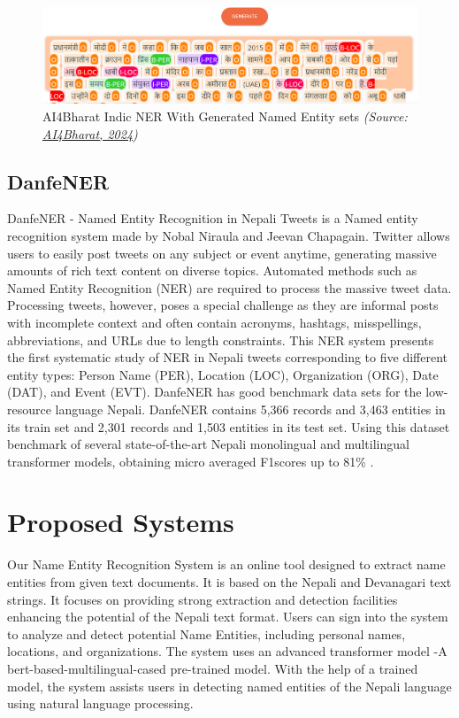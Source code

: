 \begin{figure}[H]
\centering
\includegraphics [scale=0.46 ]{img/ai4bharat/ai4bharat2.png}
\caption[AI4Bharat
Indic NER With Generated Named Entity sets]{AI4Bharat
Indic NER With Generated Named Entity sets \textit{(Source: \href{https://ai4bharat.iitm.ac.in/}{AI4Bharat, 2024})}}
\label{fig:DisplaCy.png}

\end{figure}



\subsection{DanfeNER}

DanfeNER - Named Entity Recognition in Nepali Tweets is a Named entity recognition system made by Nobal Niraula and Jeevan Chapagain. Twitter allows users to easily post tweets on any subject or event anytime, generating massive amounts of rich text content on diverse topics. Automated methods such as Named Entity Recognition (NER) are required to process the massive tweet data. Processing tweets, however, poses a special challenge as they are informal posts with incomplete context and often contain acronyms, hashtags, misspellings, abbreviations, and URLs due to length constraints. This NER system presents the first systematic study of NER in Nepali tweets corresponding to five different entity types: Person Name (PER), Location (LOC), Organization (ORG), Date (DAT), and Event (EVT). DanfeNER has good benchmark data sets for the low-resource language Nepali. DanfeNER contains 5,366 records and 3,463 entities in its train set and 2,301 records and 1,503 entities in its test set. Using this dataset benchmark of several state-of-the-art Nepali monolingual and multilingual transformer models, obtaining micro averaged F1scores up to 81\% \cite{Niraula_Chapagain_2023}.

\section{Proposed Systems}
Our Name Entity Recognition System is an online tool designed to extract name entities from given text documents. It is based on the Nepali and Devanagari text strings. It focuses on providing strong extraction and detection facilities enhancing the potential of the Nepali text format. Users can sign into the system to analyze and detect potential Name Entities, including personal names, locations, and organizations. The system uses an advanced transformer model -A bert-based-multilingual-cased pre-trained model. With the help of a trained model, the system assists users in detecting named entities of the Nepali language using natural language processing.

 